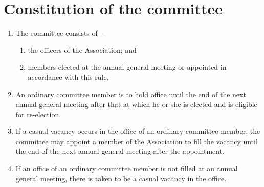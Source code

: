 \section{Constitution of the committee}
\label{rule:committeeConstitution}

\begin{enumerate}
	\item The committee consists of --
	\begin{enumerate}
		\item the officers of the Association; and
		\item \orgCommitteeExtras{} members elected at the annual general meeting or appointed in accordance with this rule.
	\end{enumerate}
	
	\item An ordinary committee member is to hold office until the end of the next annual general meeting after that at which he or she is elected and is eligible for re-election.
	\item If a casual vacancy occurs in the office of an ordinary committee member, the committee may appoint a member of the Association to fill the vacancy until the end of the next annual general meeting after the appointment.
	\item If an office of an ordinary committee member is not filled at an annual general meeting, there is taken to be a casual vacancy in the office.
\end{enumerate}